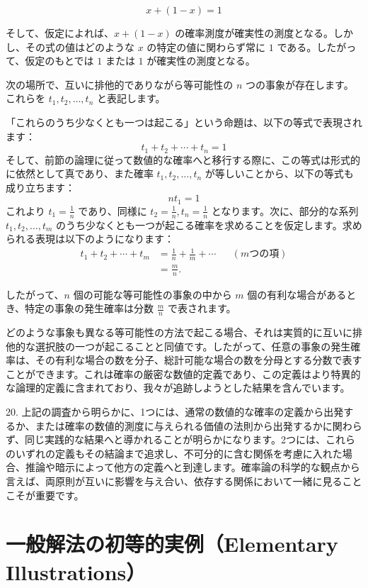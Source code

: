 \documentclass[a4paper,11pt,openany]{ltjsbook}
\begin{document}
\[
  x + (1 - x) = 1
\]

そして、仮定によれば、$x + (1 - x)$ の確率測度が確実性の測度となる。しかし、その式の値はどのような $x$ の特定の値に関わらず常に $1$ である。したがって、仮定のもとでは $1$ または $1$ が確実性の測度となる。

次の場所で、互いに排他的でありながら等可能性の $n$ つの事象が存在します。これらを $t_1, t_2, \dotsc, t_n$ と表記します。


「これらのうち少なくとも一つは起こる」という命題は、以下の等式で表現されます：
\[
t_1 + t_2 + \dotsb + t_n = 1
\]
そして、前節の論理に従って数値的な確率へと移行する際に、この等式は形式的に依然として真であり、また確率 $t_1, t_2, \dotsc, t_n$ が等しいことから、以下の等式も成り立ちます：
\[
nt_1 = 1
\]
これより $t_1 = \frac{1}{n}$ であり、同様に $t_2 = \frac{1}{n}, t_n = \frac{1}{n}$ となります。次に、部分的な系列 $t_1, t_2, \dotsc, t_m$ のうち少なくとも一つが起こる確率を求めることを仮定します。求められる表現は以下のようになります：
\begin{align*}
t_1 + t_2 + \dotsb + t_m &= \frac{1}{n} + \frac{1}{m} + \dotsb &&(m つの項)\\
                        &= \frac{m}{n}.
\end{align*}

したがって、$n$ 個の可能な等可能性の事象の中から $m$ 個の有利な場合があるとき、特定の事象の発生確率は分数 $\frac{m}{n}$ で表されます。

どのような事象も異なる等可能性の方法で起こる場合、それは実質的に互いに排他的な選択肢の一つが起こることと同値です。したがって、任意の事象の発生確率は、その有利な場合の数を分子、総計可能な場合の数を分母とする分数で表すことができます。これは確率の厳密な数値的定義であり、この定義はより特異的な論理的定義に含まれており、我々が追跡しようとした結果を含んでいます。

20. 上記の調査から明らかに、1つには、通常の数値的な確率の定義から出発するか、または確率の数値的測度に与えられる価値の法則から出発するかに関わらず、同じ実践的な結果へと導かれることが明らかになります。2つには、これらのいずれの定義もその結論まで追求し、不可分的に含む関係を考慮に入れた場合、推論や暗示によって他方の定義へと到達します。確率論の科学的な観点から言えば、両原則が互いに影響を与え合い、依存する関係において一緒に見ることこそが重要です。

\newpage

\chapter{一般解法の初等的実例（Elementary Illustrations）}
\label{ch:xviii}
\end{document}
